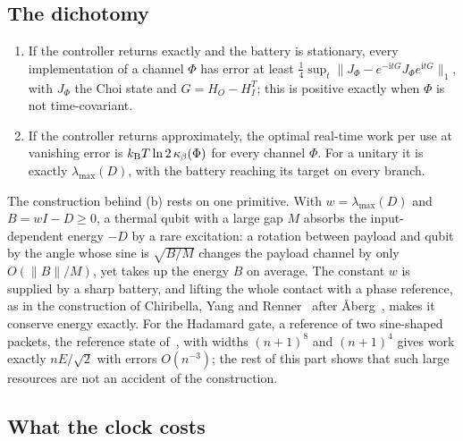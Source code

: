 \FloatBarrier
\subsection{The dichotomy}\label{kt:sec:dichotomy}

\begin{theorem}\label{kt:thm:dichotomy}
\begin{enumerate}[label=(\alph*)]
\item If the controller returns exactly and the battery is stationary, every implementation of a channel $\Phi$ has error at least $\frac14\sup_t\|J_\Phi-e^{-\mathrm itG}J_\Phi e^{\mathrm itG}\|_1$, with $J_\Phi$ the Choi state and $G=H_O-H_I^T$; this is positive exactly when $\Phi$ is not time-covariant.
\item If the controller returns approximately, the optimal real-time work per use at vanishing error is $k_{\mathrm B} T\ln2\,\kappa_\beta(\Phi)$ for every channel $\Phi$. For a unitary it is exactly $\lambda_{\max}(D)$, with the battery reaching its target on every branch.
\end{enumerate}
\end{theorem}

The construction behind (b) rests on one primitive. With $w=\lambda_{\max}(D)$ and $B=wI-D\ge0$, a thermal qubit with a large gap $M$ absorbs the input-dependent energy $-D$ by a rare excitation: a rotation between payload and qubit by the angle whose sine is $\sqrt{B/M}$ changes the payload channel by only $O(\|B\|/M)$, yet takes up the energy $B$ on average. The constant $w$ is supplied by a sharp battery, and lifting the whole contact with a phase reference, as in the construction of Chiribella, Yang and Renner~\cite{ChiribellaYangRenner21} after {\AA}berg~\cite{Aberg14}, makes it conserve energy exactly. For the Hadamard gate, a reference of two sine-shaped packets, the reference state of~\cite{ChiribellaYangRenner21}, with widths $(n+1)^8$ and $(n+1)^4$ gives work exactly $nE/\sqrt2$ with errors $O(n^{-3})$; the rest of this part shows that such large resources are not an accident of the construction.

\subsection{What the clock costs}\label{kt:sec:costs}

